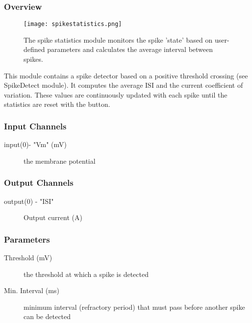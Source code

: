 \subsubsection{Overview}
\label{Spike Statistics}
\begin{figure}[h]
\begin{center}
\texttt{[image: spikestatistics.png]} 
\caption[Spike Statistics]{The spike statistics module monitors the spike 
'state' based on user-defined parameters and calculates the average interval between spikes.} 
\end{center}
\label{spikestatistics}
\end{figure}

This module contains a spike detector based on a positive threshold crossing (see SpikeDetect module). It computes the average ISI and the current coefficient of variation. These values are continuously updated with each spike until the statistics are reset with the button.

\subsubsection{Input Channels}
\begin{description}
\item[input(0)- "Vm" (mV)] the membrane potential
\end{description}

\subsubsection{Output Channels}
\begin{description}
\item[output(0) - "ISI"] Output current (A)
\end{description}

\subsubsection{Parameters}
\begin{description}
\item[Threshold (mV)] the threshold at which a spike is detected
\item[Min. Interval (ms)] minimum interval (refractory period) that must pass before another spike can be detected
\end{description}